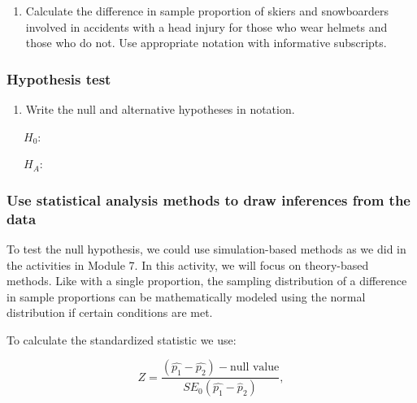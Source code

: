 \documentclass[
]{report}
\providecommand{\tightlist}{%
  \setlength{\itemsep}{0pt}\setlength{\parskip}{0pt}}
\begin{document}
\vspace{1in}

\begin{enumerate}
\def\labelenumi{\arabic{enumi}.}
\setcounter{enumi}{2}
\tightlist
\item
  Calculate the difference in sample proportion of skiers and snowboarders involved in accidents with a head injury for those who wear helmets and those who do not. Use appropriate notation with informative subscripts.
\end{enumerate}

\vspace{0.8in}

\subsubsection*{Hypothesis test}\label{hypothesis-test-2}

\begin{enumerate}
\def\labelenumi{\arabic{enumi}.}
\setcounter{enumi}{3}
\tightlist
\item
  Write the null and alternative hypotheses in notation.
\end{enumerate}

~~~\(H_0\):

\vspace{0.2in}

~~~\(H_A\):

\vspace{0.2in}

\subsubsection*{Use statistical analysis methods to draw inferences from the data}\label{use-statistical-analysis-methods-to-draw-inferences-from-the-data-3}

To test the null hypothesis, we could use simulation-based methods as we did in the activities in Module 7. In this activity, we will focus on theory-based methods. Like with a single proportion, the sampling distribution of a difference in sample proportions can be mathematically modeled using the normal distribution if certain conditions are met.

To calculate the standardized statistic we use:

\[
Z = \frac{(\hat{p_1} - \hat{p_2}) - \text{null value}}{SE_0(\hat{p_1}-\hat{p}_2)},
\]
\end{document}

